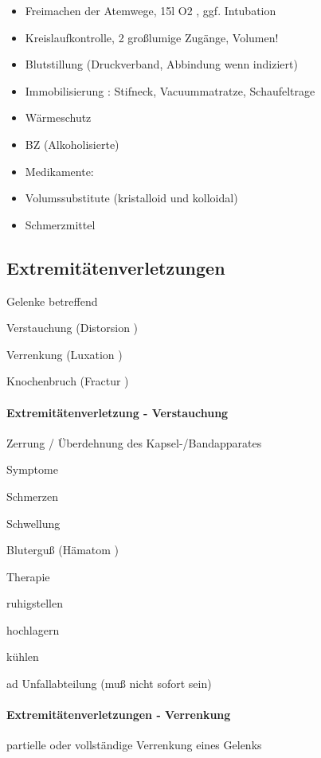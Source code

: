 \documentclass{article}
\begin{document}
\begin{itemize}
\item Freimachen der Atemwege, 15l O2 , ggf.  Intubation

\item Kreislaufkontrolle, 2 gro{\ss}lumige Zug\"ange,  Volumen!

\item Blutstillung  (Druckverband, Abbindung wenn  indiziert)

\item Immobilisierung : Stifneck, Vacuummatratze,  Schaufeltrage

\item W\"armeschutz

\item BZ (Alkoholisierte)

\item Medikamente: 

\item Volumssubstitute (kristalloid und kolloidal)

\item Schmerzmittel

\end{itemize}
\subsection{Extremit\"atenverletzungen}
Gelenke betreffend

Verstauchung (Distorsion )

Verrenkung (Luxation )

Knochenbruch (Fractur )

\paragraph{Extremit\"atenverletzung - Verstauchung}
Zerrung / \"Uberdehnung des  Kapsel-/Bandapparates

Symptome

Schmerzen

Schwellung

Blutergu{\ss} (H\"amatom )

Therapie

ruhigstellen

hochlagern

k\"uhlen

ad Unfallabteilung (mu{\ss} nicht sofort sein)

\paragraph{Extremit\"atenverletzungen - Verrenkung}
partielle oder vollst\"andige Verrenkung  eines Gelenks
\end{document}
